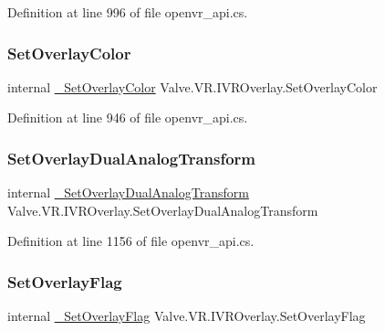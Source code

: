 Definition at line 996 of file openvr\+\_\+api.\+cs.

\mbox{\label{struct_valve_1_1_v_r_1_1_i_v_r_overlay_a14c3daebf2bf8299287333a5eebec8a3}} 
\subsubsection{\texorpdfstring{SetOverlayColor}{SetOverlayColor}}
{\footnotesize\ttfamily internal \mbox{\hyperlink{struct_valve_1_1_v_r_1_1_i_v_r_overlay_ae4f9f357c73e29c9b4e88c6f8070df8e}{\+\_\+\+Set\+Overlay\+Color}} Valve.\+V\+R.\+I\+V\+R\+Overlay.\+Set\+Overlay\+Color}



Definition at line 946 of file openvr\+\_\+api.\+cs.

\mbox{\label{struct_valve_1_1_v_r_1_1_i_v_r_overlay_aaba1bf2f9f74aa606c5dbdc8f77f59b1}} 
\subsubsection{\texorpdfstring{SetOverlayDualAnalogTransform}{SetOverlayDualAnalogTransform}}
{\footnotesize\ttfamily internal \mbox{\hyperlink{struct_valve_1_1_v_r_1_1_i_v_r_overlay_ae1a52476bb06ce07f2f80b32bac7b577}{\+\_\+\+Set\+Overlay\+Dual\+Analog\+Transform}} Valve.\+V\+R.\+I\+V\+R\+Overlay.\+Set\+Overlay\+Dual\+Analog\+Transform}



Definition at line 1156 of file openvr\+\_\+api.\+cs.

\mbox{\label{struct_valve_1_1_v_r_1_1_i_v_r_overlay_a203cf261dd56441b5692df6f3310410f}} 
\subsubsection{\texorpdfstring{SetOverlayFlag}{SetOverlayFlag}}
{\footnotesize\ttfamily internal \mbox{\hyperlink{struct_valve_1_1_v_r_1_1_i_v_r_overlay_a4640d4e761c851e4673dbabf21915b14}{\+\_\+\+Set\+Overlay\+Flag}} Valve.\+V\+R.\+I\+V\+R\+Overlay.\+Set\+Overlay\+Flag}



